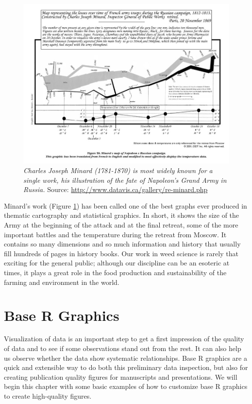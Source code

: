 \documentclass[letterpaper,]{book}
\begin{document}
\begin{figure}
\centering
\includegraphics{minardodt.png}
\caption{\label{fig:minardPlot}\emph{Charles Joseph Minard (1781-1870) is most widely known for a single work, his illustration of the fate of Napoleon's Grand Army in Russia.} Source: \url{http://www.datavis.ca/gallery/re-minard.php}}
\end{figure}

Minard's work (Figure \ref{fig:minardPlot}) has been called one of the best graphs ever produced in thematic cartography and statistical graphics. In short, it shows the size of the Army at the beginning of the attack and at the final retreat, some of the more important battles and the temperature during the retreat from Moscow. It contains so many dimensions and so much information and history that usually fill hundreds of pages in history books. Our work in weed science is rarely that exciting for the general public; although our discipline can be an esoteric at times, it plays a great role in the food production and sustainability of the farming and environment in the world.

\hypertarget{base-r-graphics}{%
\section{Base R Graphics}\label{base-r-graphics}}

Visualization of data is an important step to get a first impression of the quality of data and to see if some observations stand out from the rest. It can also help us observe whether the data show systematic relationships. Base R graphics are a quick and extensible way to do both this preliminary data inspection, but also for creating publication quality figures for manuscripts and presentations. We will begin this chapter with some basic examples of how to customize base R graphics to create high-quality figures.
\end{document}
